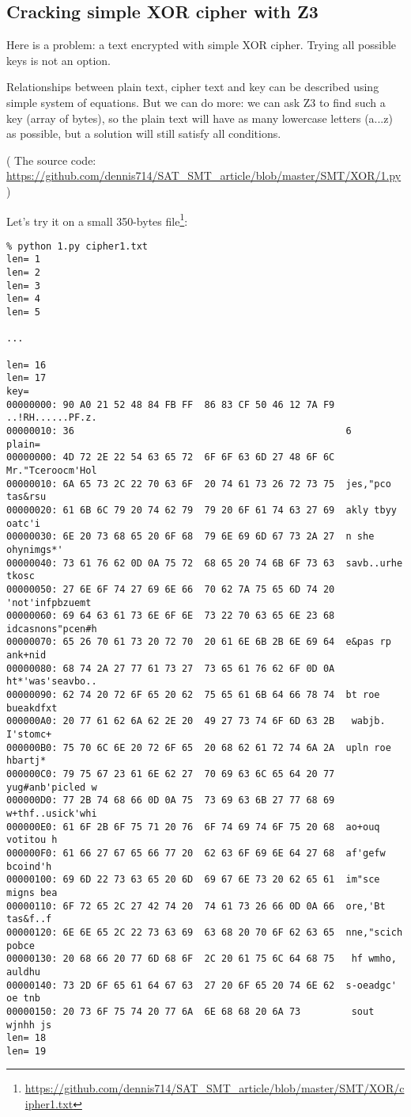 \subsection{Cracking simple XOR cipher with Z3}

Here is a problem: a text encrypted with simple XOR cipher.
Trying all possible keys is not an option.

Relationships between plain text, cipher text and key can be described using simple system of equations.
But we can do more: we can ask Z3 to find such a key (array of bytes), so the plain text will have as many lowercase
letters (a...z) as possible, but a solution will still satisfy all conditions.



( The source code: \url{https://github.com/dennis714/SAT_SMT_article/blob/master/SMT/XOR/1.py} )

Let's try it on a small 350-bytes file\footnote{\url{https://github.com/dennis714/SAT_SMT_article/blob/master/SMT/XOR/cipher1.txt}}:

\begin{lstlisting}
% python 1.py cipher1.txt
len= 1
len= 2
len= 3
len= 4
len= 5

...

len= 16
len= 17
key=
00000000: 90 A0 21 52 48 84 FB FF  86 83 CF 50 46 12 7A F9  ..!RH......PF.z.
00000010: 36                                                6
plain=
00000000: 4D 72 2E 22 54 63 65 72  6F 6F 63 6D 27 48 6F 6C  Mr."Tceroocm'Hol
00000010: 6A 65 73 2C 22 70 63 6F  20 74 61 73 26 72 73 75  jes,"pco tas&rsu
00000020: 61 6B 6C 79 20 74 62 79  79 20 6F 61 74 63 27 69  akly tbyy oatc'i
00000030: 6E 20 73 68 65 20 6F 68  79 6E 69 6D 67 73 2A 27  n she ohynimgs*'
00000040: 73 61 76 62 0D 0A 75 72  68 65 20 74 6B 6F 73 63  savb..urhe tkosc
00000050: 27 6E 6F 74 27 69 6E 66  70 62 7A 75 65 6D 74 20  'not'infpbzuemt
00000060: 69 64 63 61 73 6E 6F 6E  73 22 70 63 65 6E 23 68  idcasnons"pcen#h
00000070: 65 26 70 61 73 20 72 70  20 61 6E 6B 2B 6E 69 64  e&pas rp ank+nid
00000080: 68 74 2A 27 77 61 73 27  73 65 61 76 62 6F 0D 0A  ht*'was'seavbo..
00000090: 62 74 20 72 6F 65 20 62  75 65 61 6B 64 66 78 74  bt roe bueakdfxt
000000A0: 20 77 61 62 6A 62 2E 20  49 27 73 74 6F 6D 63 2B   wabjb. I'stomc+
000000B0: 75 70 6C 6E 20 72 6F 65  20 68 62 61 72 74 6A 2A  upln roe hbartj*
000000C0: 79 75 67 23 61 6E 62 27  70 69 63 6C 65 64 20 77  yug#anb'picled w
000000D0: 77 2B 74 68 66 0D 0A 75  73 69 63 6B 27 77 68 69  w+thf..usick'whi
000000E0: 61 6F 2B 6F 75 71 20 76  6F 74 69 74 6F 75 20 68  ao+ouq votitou h
000000F0: 61 66 27 67 65 66 77 20  62 63 6F 69 6E 64 27 68  af'gefw bcoind'h
00000100: 69 6D 22 73 63 65 20 6D  69 67 6E 73 20 62 65 61  im"sce migns bea
00000110: 6F 72 65 2C 27 42 74 20  74 61 73 26 66 0D 0A 66  ore,'Bt tas&f..f
00000120: 6E 6E 65 2C 22 73 63 69  63 68 20 70 6F 62 63 65  nne,"scich pobce
00000130: 20 68 66 20 77 6D 68 6F  2C 20 61 75 6C 64 68 75   hf wmho, auldhu
00000140: 73 2D 6F 65 61 64 67 63  27 20 6F 65 20 74 6E 62  s-oeadgc' oe tnb
00000150: 20 73 6F 75 74 20 77 6A  6E 68 68 20 6A 73         sout wjnhh js
len= 18
len= 19
\end{lstlisting}

